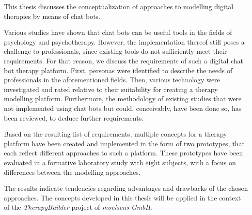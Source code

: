 This thesis discusses the conceptualization of approaches to modelling digital therapies by means of chat bots.

Various studies have shown that chat bots can be useful tools in the fields of psychology and psychotherapy. However, the implementation thereof still poses a challenge to professionals, since existing tools do not sufficiently meet their requirements.
For that reason, we discuss the requirements of such a digital chat bot therapy platform. First, personas were identified to describe the needs of professionals in the aforementioned fields. Then, various technology were investigated and rated relative to their suitability for creating a therapy modelling platform. Furthermore, the methodology of existing studies that were not implemented using chat bots but could, conceivably, have been done so, has been reviewed, to deduce further requirements.

Based on the resulting list of requirements, multiple concepts for a therapy platform have been created and implemented in the form of two prototypes, that each reflect different approaches to such a platform. These prototypes have been evaluated in a formative laboratory study with eight subjects, with a focus on differences between the modelling approaches.

The results indicate tendencies regarding advantages and drawbacks of the chosen approaches. The concepts developed in this thesis will be applied in the context of the \emph{TherapyBuilder} project of \emph{movisens GmbH}.

\cleardoublepage

